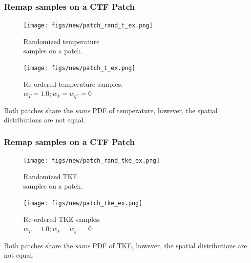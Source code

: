 \documentclass[t, pdftex]{beamer}
\begin{document}
\begin{frame}
\frametitle{Remap samples on a CTF Patch}
    \begin{figure}
        \centering
        \begin{minipage}{.5\textwidth}
            \centering
            \texttt{[image: figs/new/patch\_rand\_t\_ex.png]}
            \caption{\centering Randomized temperature \\ samples on a patch.}
        \end{minipage}%
        \begin{minipage}{.5\textwidth}
            \centering
            \texttt{[image: figs/new/patch\_t\_ex.png]}
            \caption{\centering Re-ordered temperature samples. \\ $w_T=1.0; w_k=w_{q''}=0$}
        \end{minipage}
    \end{figure}
Both patches share the \emph{same} PDF of temperature, however, the spatial distributions are not equal.
\end{frame}

\begin{frame}
\frametitle{Remap samples on a CTF Patch}
    \begin{figure}
        \centering
        \begin{minipage}{.5\textwidth}
            \centering
            \texttt{[image: figs/new/patch\_rand\_tke\_ex.png]}
            \caption{\centering Randomized TKE \\  samples on a patch.}
        \end{minipage}%
        \begin{minipage}{.5\textwidth}
            \centering
            \texttt{[image: figs/new/patch\_tke\_ex.png]}
            \caption{\centering Re-ordered TKE samples. \\  $w_T=1.0; w_k=w_{q''}=0$}
        \end{minipage}
    \end{figure}
Both patches share the \emph{same} PDF of TKE, however, the spatial distributions are not equal.
\end{frame}
\end{document}
